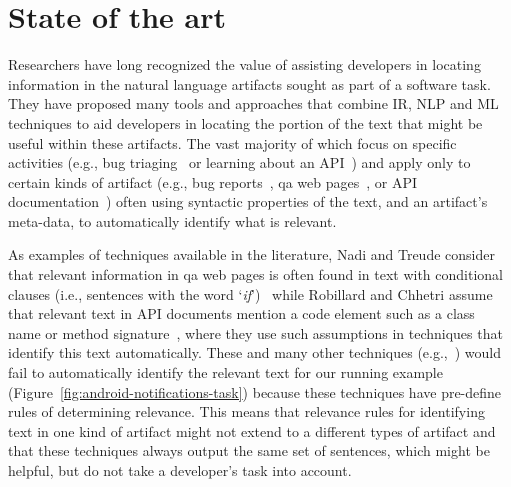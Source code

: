 \section{State of the art}
\label{cp1:novelty}


Researchers have long recognized the value of 
assisting developers in locating information in the natural language artifacts sought as part of a software task.
They have proposed many tools and approaches 
that combine \acf{IR}, \acf{NLP} and \acf{ML} techniques 
to aid developers in locating the portion of the text that
might be useful within these artifacts.
The vast majority of which focus on specific activities
(e.g., bug triaging~\cite{Chaparro2017} or learning about an API~\cite{Jiang2017}) and apply 
only to certain kinds of artifact 
(e.g., bug reports~\cite{Rastkar2010, Lotufo2012}, \acs{qa} web pages~\cite{Xu2017, silva2019}, or API documentation~\cite{fucci2019})
often using 
syntactic properties of the text, and an artifact's meta-data, to automatically identify what is relevant.



As examples of techniques available in the literature, Nadi and Treude consider 
that relevant information in \acs{qa} 
web pages is often found in text with
conditional clauses (i.e., sentences with the word `\textit{if}')~\cite{nadi2020}
while Robillard and Chhetri assume that relevant 
text in API documents mention a code element such as a class name or method signature~\cite{Robillard2015},
where they use such assumptions 
in techniques that identify this text automatically.
These and many other techniques (e.g.,~\cite{chaparro2019, fucci2019}) would fail to automatically identify the relevant text for our running example
(Figure~\ref{fig:android-notifications-task})
because these techniques have pre-define rules of determining relevance.
This means that 
relevance rules for identifying text in one kind of artifact
might not extend to a different types of artifact
and that these techniques always output the same set of sentences, 
which might be helpful, 
but do not take a developer's task into account.




